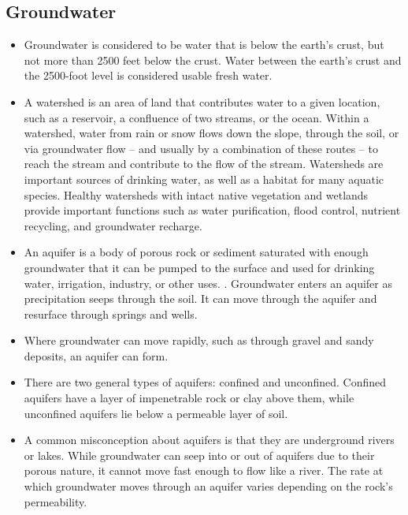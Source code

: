 \subsection{Groundwater}
\begin{itemize}
\item Groundwater is considered to be water that is below the earth’s crust, but not more than 2500 feet below the crust. Water between the earth’s crust and the 2500-foot level is considered usable fresh water.\\

\item A watershed is an area of land that contributes water to a given location, such as a reservoir, a confluence of two streams, or the ocean. Within a watershed, water from rain or snow flows down the slope, through the soil, or via groundwater flow – and usually by a combination of these routes – to reach the stream and contribute to the flow of the stream. Watersheds are
important sources of drinking water, as well as a habitat for many aquatic species. Healthy watersheds with intact native vegetation and wetlands provide important functions such as water purification, flood control, nutrient recycling, and groundwater recharge.

\item An aquifer is a body of porous rock or sediment saturated with enough groundwater that it can be pumped to the surface and used for drinking water, irrigation, industry, or other uses. . Groundwater enters an aquifer as precipitation seeps through the soil. It can move through the aquifer and resurface through springs and wells.

\item Where groundwater can move rapidly, such as through gravel and sandy
deposits, an aquifer can form.  

\item There are two general types of aquifers: confined and unconfined. Confined aquifers have a layer of impenetrable rock or clay above them, while unconfined aquifers lie below a permeable layer of soil.

\item A common misconception about aquifers is that they are underground rivers or lakes. While groundwater can seep into or out of aquifers due to their porous nature, it cannot move fast enough to flow like a river. The rate at which groundwater moves through an aquifer varies depending on the rock’s permeability.


\end{itemize}
